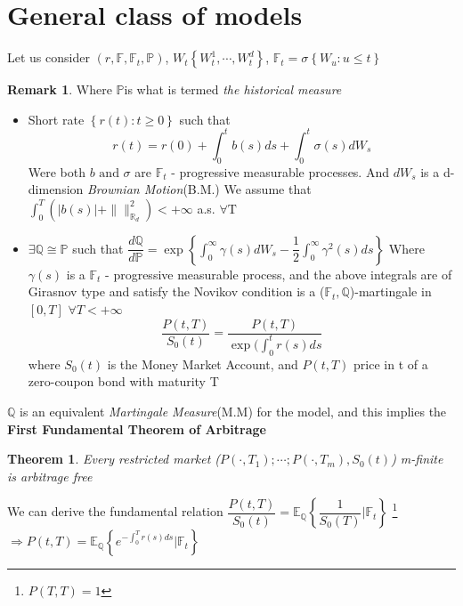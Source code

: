\documentclass[10pt, oneside, reqno]{amsbook}
\theoremstyle{plain}%
\newtheorem{thm}{Theorem}[chapter]
\theoremstyle{definition}
\theoremstyle{rem}
\newtheorem*{rem}{Remark}
\theoremstyle{definition}
\def\Pbb{\ensuremath{\mathbb{P}}}
\def\Qbb{\ensuremath{\mathbb{Q}}}
\def\Rbb{\ensuremath{\mathbb{R}}}
\newcommand{\lt}{<}
\newcommand{\F}{\mathbb{F}}
\numberwithin{equation}{chapter}
\begin{document}
\section{General class of models}
Let us consider $(r, \F, \F_{t}, \Pbb)$, 
$W_{t} \left\lbrace W_{t}^{1}, \cdots, W_{t}^{d} \right\rbrace$,
$\F_t = \sigma \left\lbrace W_u: u \leq t \right\rbrace$
\begin{rem}
 Where \Pbb is what is termed \textit{the historical measure}
\end{rem}
\begin{itemize}
 \item Short rate $\left\lbrace r(t): t \geq 0 \right\rbrace$ such that 
\begin{equation}
 r(t) = r(0) + \int_{0}^{t} b(s) ds + \int_0^t \sigma(s) dW_{s}
\end{equation}
Were both $b \text{ and } \sigma$ are $\F_t$ - progressive measurable processes. 
And $dW_s$ is a d-dimension \textit{Brownian Motion}(B.M.)
We assume that $\int_0^T \left( |b(s)| + \|\|^2_{\Rbb_{d}}\right) < + \infty$ a.s. $\forall \text{T}$
\item $\exists \Qbb \cong \Pbb$ such that $\dfrac{d \Qbb}{d \Pbb} = \exp \left\lbrace\int_0^\infty \gamma(s) dW_s
- \dfrac{1}{2} \int_0^\infty \gamma^{2}(s) ds \right\rbrace$ 
\newline Where $\gamma(s)$ is a $\F_t$ - progressive measurable process, and the above integrals are
of Girasnov type and satisfy the Novikov condition is a ($\F_t, \Qbb$)-martingale in $[0,T]$ $\forall T 
\lt +\infty$
\begin{equation}
 \dfrac{P(t,T)}{S_{0}(t)} = \dfrac{P(t,T)}{\exp(\int_0^t r(s) ds}
\end{equation}
where $S_0(t)$ is the Money Market Account, and $P(t,T)$ price in t of a zero-coupon bond with maturity T
\end{itemize}
$\Qbb$ is an equivalent \textit{Martingale Measure}(M.M) for the model, and this implies the \textbf{First
 Fundamental
Theorem of Arbitrage} 
\begin{thm}
 Every restricted market ($P(\cdot, T_1); \cdots ; P(\cdot, T_m), S_{0}(t)$) m-finite is \textit{arbitrage free}
\end{thm}
We can derive the fundamental relation 
$\dfrac{P(t,T)}{S_0(t)} = \mathbb{E}_{\Qbb} \left\lbrace \dfrac{1}{S_{0}(T)} | \F_{t}\right\rbrace$
\footnote{$P(T,T) = 1$}
$\Rightarrow P(t,T) = \mathbb{E}_{\Qbb} \left\lbrace e^{-\int_{0}^{T} r(s) ds} | \F_t\right\rbrace$
\end{document}
